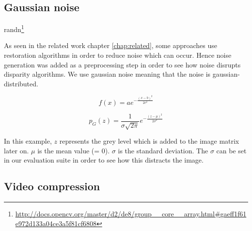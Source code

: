 \subsection*{Gaussian noise}

randn\footnote{\url{http://docs.opencv.org/master/d2/de8/group__core__array.html\#gaeff1f61e972d133a04ce3a5f81cf6808}}


\citep{opencv_library}

As seen in the related work chapter \ref{chap:related}, some approaches use restoration algorithms in order to reduce noise which can occur.
Hence noise generation was added as a preprocessing step in order to see how noise disrupts disparity algorithms.
We use gaussian noise meaning that the noise is gaussian-distributed.

$$f\left(x\right) = a e^{- { \frac{(x-b)^2 }{ 2 c^2} } }$$

$$p_G(z) = \frac{1}{\sigma\sqrt{2\pi}} e^{ -\frac{(z-\mu)^2}{2\sigma^2} }$$

\noindent In this example, $z$ represents the grey level which is added to the image matrix later on.
$\mu$ is the mean value (= 0).
$\sigma$ is the standard deviation.
\newline\newline\noindent The $\sigma$ can be set in our evaluation suite in order to see how this distracts the image.


\begin{figure}[h!]
\center
{}
\end{figure}

\subsection*{Video compression}

